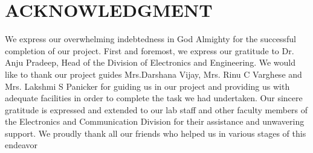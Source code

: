 \chapter*{ACKNOWLEDGMENT}
We express our overwhelming indebtedness in God Almighty for the successful completion of
our project. First and foremost, we express our gratitude to Dr. Anju Pradeep, Head of the
Division of Electronics and Engineering. We would like to thank our project guides
Mrs.Darshana Vijay, Mrs. Rinu C Varghese and Mrs. Lakshmi S Panicker for guiding us in
our project and providing us with adequate facilities in order to complete the task we had
undertaken.
Our sincere gratitude is expressed and extended to our lab staff and other faculty members of
the Electronics and Communication Division for their assistance and unwavering support.
We proudly thank all our friends who helped us in various stages of this endeavor
